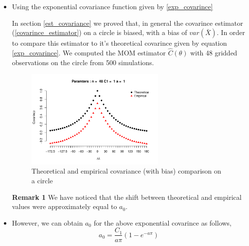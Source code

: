 \begin{itemize}
		
	\item Using the exponential covariance function given by \ref{exp_covarince}
	      	      
	      In section \ref{est_covariance} we proved that, in general the covarince estimator (\ref{covarince_estimator}) on a circle is biased, with a bias of $var(\bar{X})$. In order to compare this estimator to it's theoretical covarince given by equation \ref{exp_covarince}. We computed the MOM estimator $\hat{C}(\theta)$ with 48 gridded observations on the circle from 500 simulations. 
	      	      
	      \begin{figure}[H] 
	      	\label{covarince_circle}
	      	\centering
	      	\includegraphics[width=0.65\textwidth]{graphs/covarince_circle}
	      	\caption {Theoretical and empirical covariance (with bias) comparison on a circle}
	      \end{figure}
	      	      
	      {\bf Remark 1} We have noticed that the shift between theoretical and empirical values were approximately equal to $a_0$.\\
	      	      
	      
	      	      
	\item However, we can obtain $a_0$ for the above exponential covarince as follows,
	      \[
	      	a_0 = \frac{C_1}{a\pi}(1 - e^{-a\pi})
	      \]
	      	      

\end{itemize}
